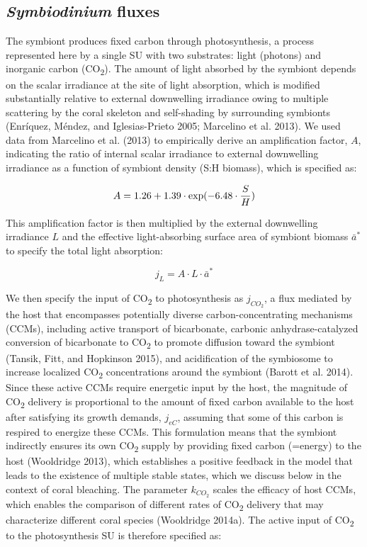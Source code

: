 \documentclass[]{elsarticle} %
\begin{document}
\subsection{\texorpdfstring{\emph{Symbiodinium}
fluxes}{Symbiodinium fluxes}}\label{symbiodinium-fluxes}

The symbiont produces fixed carbon through photosynthesis, a process
represented here by a single SU with two substrates: light (photons) and
inorganic carbon (CO\textsubscript{2}). The amount of light absorbed by
the symbiont depends on the scalar irradiance at the site of light
absorption, which is modified substantially relative to external
downwelling irradiance owing to multiple scattering by the coral
skeleton and self-shading by surrounding symbionts (Enríquez, Méndez,
and Iglesias-Prieto 2005; Marcelino et al. 2013). We used data from
Marcelino et al. (2013) to empirically derive an amplification factor,
\(A\), indicating the ratio of internal scalar irradiance to external
downwelling irradiance as a function of symbiont density (S:H biomass),
which is specified as:

\begin{equation} A = 1.26 + 1.39 \cdot \exp(-6.48 \cdot {S \over H}) \end{equation}

This amplification factor is then multiplied by the external downwelling
irradiance \(L\) and the effective light-absorbing surface area of
symbiont biomass \(\bar{a}^*\) to specify the total light absorption:

\begin{equation} j_L =  A \cdot L \cdot \bar{a}^* \end{equation}

We then specify the input of CO\textsubscript{2} to photosynthesis as
\(j_{CO_2}\), a flux mediated by the host that encompasses potentially
diverse carbon-concentrating mechanisms (CCMs), including active
transport of bicarbonate, carbonic anhydrase-catalyzed conversion of
bicarbonate to CO\textsubscript{2} to promote diffusion toward the
symbiont (Tansik, Fitt, and Hopkinson 2015), and acidification of the
symbiosome to increase localized CO\textsubscript{2} concentrations
around the symbiont (Barott et al. 2014). Since these active CCMs
require energetic input by the host, the magnitude of
CO\textsubscript{2} delivery is proportional to the amount of fixed
carbon available to the host after satisfying its growth demands,
\(j_{eC}\), assuming that some of this carbon is respired to energize
these CCMs. This formulation means that the symbiont indirectly ensures
its own CO\textsubscript{2} supply by providing fixed carbon (=energy)
to the host (Wooldridge 2013), which establishes a positive feedback in
the model that leads to the existence of multiple stable states, which
we discuss below in the context of coral bleaching. The parameter
\(k_{CO_2}\) scales the efficacy of host CCMs, which enables the
comparison of different rates of CO\textsubscript{2} delivery that may
characterize different coral species (Wooldridge 2014a). The active
input of CO\textsubscript{2} to the photosynthesis SU is therefore
specified as:
\end{document}

